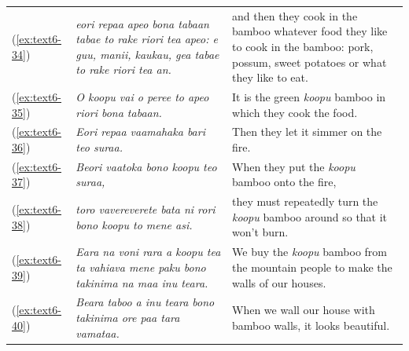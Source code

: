 \documentclass[output=paper]{langscibook}
\begin{document}
\begin{xltabular}{\textwidth}{lXX}
    (\ref{ex:text6-34})&\textit{eori repaa apeo bona tabaan tabae to rake riori tea apeo: e guu, manii, kaukau, gea tabae to rake riori tea an.}&and then they cook in the bamboo whatever food they like to cook in the bamboo: pork, possum, sweet potatoes or what they like to eat.\\
    (\ref{ex:text6-35})&\textit{O koopu vai o peree to apeo riori bona tabaan.}&It is the green \textit{koopu} bamboo in which they cook the food.\\
    (\ref{ex:text6-36})&\textit{Eori repaa vaamahaka bari teo suraa.}&Then they let it simmer on the fire.\\
    (\ref{ex:text6-37})&\textit{Beori vaatoka bono koopu teo suraa,}&When they put the \textit{koopu} bamboo onto the fire,\\
    (\ref{ex:text6-38})&\textit{toro vavereverete bata ni rori bono koopu to mene asi.}&they must repeatedly turn the \textit{koopu} bamboo around so that it won't burn.\\
    (\ref{ex:text6-39})&\textit{Eara na voni rara a koopu tea ta vahiava mene paku bono takinima na maa inu teara.}&We buy the \textit{koopu} bamboo from the mountain people to make the walls of our houses.\\
    (\ref{ex:text6-40})&\textit{Beara taboo a inu teara bono takinima ore paa tara vamataa.}&When we wall our house with bamboo walls,  it looks beautiful.\footnotemark\\
\end{xltabular}
\end{document}

